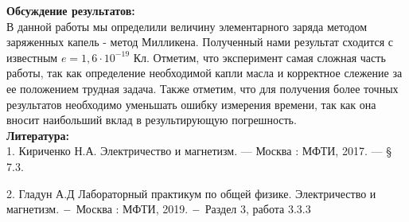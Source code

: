\documentclass[a4paper, 12pt]{article}%
\begin{document}
	\textbf{Обсуждение результатов: }\\
	
	В данной работы мы определили величину элементарного заряда методом заряженных капель - метод Милликена. Полученный нами результат сходится с известным $e = 1,6 \cdot 10^{-19}$ Кл. Отметим, что эксперимент самая сложная часть работы, так как определение необходимой капли масла и корректное слежение за ее положением трудная задача. Также отметим, что для получения более точных результатов необходимо уменьшать ошибку измерения времени, так как она вносит наибольший вклад в результирующую погрешность.\\
	
	\textbf{Литература: }\\
	
	1. Кириченко Н.А. Электричество и магнетизм. — Москва : МФТИ, 2017. — § 7.3.
	
	2. Гладун А.Д Лабораторный практикум по общей физике. Электричество и магнетизм. $\--$ Москва : МФТИ, 2019. $\--$ Раздел 3, работа 3.3.3 
	
	
	
	
\end{document}
